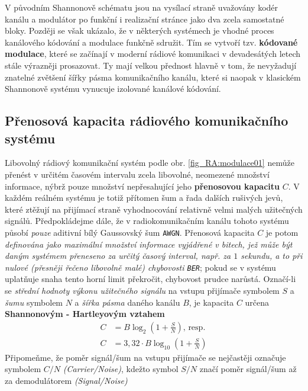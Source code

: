     V původním Shannonově schématu jsou na vysílací straně uvažovány kodér kanálu a modulátor po 
    funkční i realizační stránce jako dva zcela samostatné bloky. Později se však ukázalo, že v 
    některých systémech je vhodné proces ka\-ná\-lo\-vé\-ho kódování a modulace funkčně sdružit. 
    Tím se vytvoří tzv. \textbf{kódované modulace}, které se začínají v moderní rádiové komunikaci 
    v devadesátých letech stále výrazněji prosazovat. Ty mají velkou přednost hlavně v tom, že 
    nevyžadují znatelné zvětšení šířky pásma komunikačního kanálu, které si naopak v klasickém 
    Shannonově systému vynucuje izolované kanálové kódování. \cite[s.~75]{ZaludRA}
    
    \subsection{Přenosová kapacita rádiového komunikačního systému}
      Libovolný rádiový komunikační systém podle obr. \ref{fig_RA:modulace01} nemůže přenést v 
      určitém časovém intervalu zcela libovolné, neomezené množství informace, nýbrž pouze množství 
      nepřesahující jeho \textbf{přenosovou kapacitu} \(C\). V každém reálném systému je totiž 
      přítomen šum a řada dalších rušivých jevů, které ztěžují na přijímací straně vyhodnocování 
      relativně velmi malých užitečných signálů. Předpokládejme dále, že v radiokomunikačním kanálu 
      tohoto systému působí \emph{pouze} aditivní bílý Gaussovský šum \texttt{AWGN}. Přenosová 
      kapacita \(C\) je potom \emph{definována jako maximální množství informace vyjádřené v 
      bitech, jež může být daným systémem přeneseno za určitý časový interval, např. za \(1\) 
      sekundu, a to při nulové (přesněji řečeno libovolně malé) chybovosti \texttt{BER}}; pokud se 
      v systému 
      uplatňuje snaha tento horní limit překročit, chybovost prudce narůstá. Označí-li se 
      \emph{střední hodnoty výkonu užitečného signálu} na vstupu přijímače symbolem \(S\) a 
      \emph{šumu} symbolem \(N\) a \emph{šířka pásma} daného kanálu \(B\), je kapacita \(C\) určena 
      \textbf{Shannonovým - Hartleyovým vztahem}
      \begin{subequations}
        \label{eq:RA_shannon_C01}
        \begin{align}
          C &= B\log_2\left(1+\frac{S}{N}\right),\,\text{resp.}    \label{eq:RA_shannon_C01a} \\ 
          C &= 3,32\cdot B\log_{10}\left(1+\frac{S}{N}\right)      \label{eq:RA_shannon_C01b}
        \end{align}
      \end{subequations}
      Připomeňme, že poměr signál/šum na vstupu přijímače se nejčastěji označuje symbolem \(C/N\) 
      \emph{(Carrier/Noise)}, kdežto symbol \(S/N\) značí poměr signál/šum až za demodulátorem 
      \emph{(Signal/Noise)}
      
